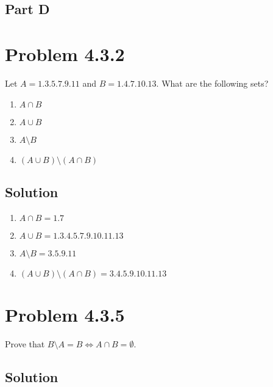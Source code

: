 \documentclass[12pt]{extarticle}
\begin{document}
\subsection*{Part D}


\section*{Problem 4.3.2}

Let $A = \qty{1, 3, 5, 7, 9, 11}$ and $B = \qty{1, 4, 7, 10, 13}$. What are the following sets? 
\begin{enumerate}[label=(\alph*)]
	\item $A \cap B$
	\item $A \cup B$
	\item $A \setminus B $
	\item $(A \cup B) \setminus (A \cap B)$
\end{enumerate}

\subsection*{Solution}

\begin{enumerate}[label=(\alph*)]
	\item $A \cap B = \qty{1,7}$
	\item $A \cup B = \qty{1, 3, 4, 5, 7, 9, 10, 11, 13}$
	\item $A \setminus B = \qty{3, 5, 9, 11}$
	\item $(A \cup B) \setminus (A \cap B) = \qty{3, 4, 5, 9, 10, 11, 13}$
\end{enumerate}

\section*{Problem 4.3.5}

Prove that $B \setminus A = B \Longleftrightarrow A \cap B = \emptyset$.

\subsection*{Solution}
\end{document}
